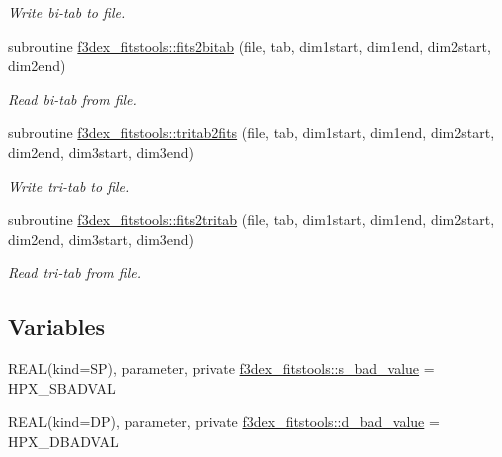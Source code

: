 \begin{DoxyCompactItemize}
\begin{DoxyCompactList}\small\item\em Write bi-\/tab to file. \end{DoxyCompactList}\item 
subroutine \hyperlink{namespacef3dex__fitstools_a5c4a0cf23d0152d7449eb2afb09ad563}{f3dex\_\-fitstools::fits2bitab} (file, tab, dim1start, dim1end, dim2start, dim2end)
\begin{DoxyCompactList}\small\item\em Read bi-\/tab from file. \end{DoxyCompactList}\item 
subroutine \hyperlink{namespacef3dex__fitstools_a98c44872e5b5937bef4cccfcc2a21c43}{f3dex\_\-fitstools::tritab2fits} (file, tab, dim1start, dim1end, dim2start, dim2end, dim3start, dim3end)
\begin{DoxyCompactList}\small\item\em Write tri-\/tab to file. \end{DoxyCompactList}\item 
subroutine \hyperlink{namespacef3dex__fitstools_a1daf125726e201b6f4f84e709e23ccc0}{f3dex\_\-fitstools::fits2tritab} (file, tab, dim1start, dim1end, dim2start, dim2end, dim3start, dim3end)
\begin{DoxyCompactList}\small\item\em Read tri-\/tab from file. \end{DoxyCompactList}\end{DoxyCompactItemize}
\subsection*{Variables}
\begin{DoxyCompactItemize}
\item 
REAL(kind=SP), parameter, private \hyperlink{namespacef3dex__fitstools_a7841ef704a851792da5858a872caa0e4}{f3dex\_\-fitstools::s\_\-bad\_\-value} = HPX\_\-SBADVAL
\item 
REAL(kind=DP), parameter, private \hyperlink{namespacef3dex__fitstools_ae70f4f4f98f16a18e429bfd5f014d650}{f3dex\_\-fitstools::d\_\-bad\_\-value} = HPX\_\-DBADVAL
\end{DoxyCompactItemize}

